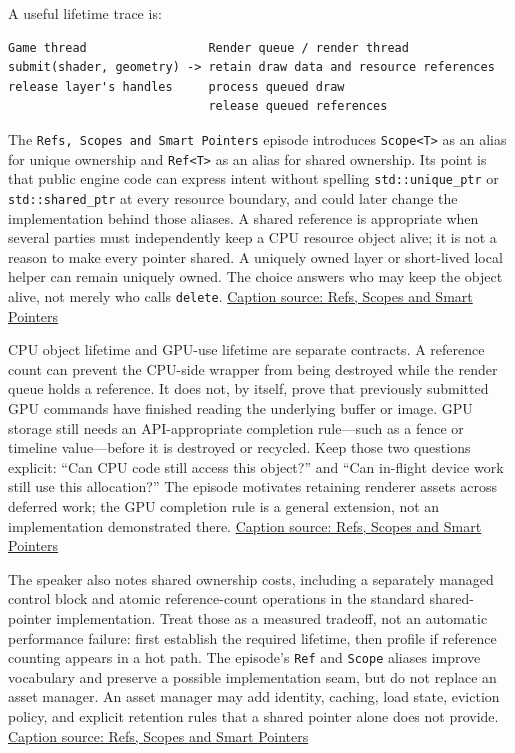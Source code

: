 A useful lifetime trace is:

\begin{verbatim}
Game thread                 Render queue / render thread
submit(shader, geometry) -> retain draw data and resource references
release layer's handles     process queued draw
                            release queued references
\end{verbatim}

The \texttt{Refs,\ Scopes\ and\ Smart\ Pointers} episode introduces \texttt{Scope\textless{}T\textgreater{}} as an alias for unique ownership and \texttt{Ref\textless{}T\textgreater{}} as an alias for shared ownership. Its point is that public engine code can express intent without spelling \texttt{std::unique\_ptr} or \texttt{std::shared\_ptr} at every resource boundary, and could later change the implementation behind those aliases. A shared reference is appropriate when several parties must independently keep a CPU resource object alive; it is not a reason to make every pointer shared. A uniquely owned layer or short-lived local helper can remain uniquely owned. The choice answers who may keep the object alive, not merely who calls \texttt{delete}. \href{https://www.youtube.com/watch?v=HkGZ378nArE}{Caption source: Refs, Scopes and Smart Pointers}

CPU object lifetime and GPU-use lifetime are separate contracts. A reference count can prevent the CPU-side wrapper from being destroyed while the render queue holds a reference. It does not, by itself, prove that previously submitted GPU commands have finished reading the underlying buffer or image. GPU storage still needs an API-appropriate completion rule---such as a fence or timeline value---before it is destroyed or recycled. Keep those two questions explicit: ``Can CPU code still access this object?'' and ``Can in-flight device work still use this allocation?'' The episode motivates retaining renderer assets across deferred work; the GPU completion rule is a general extension, not an implementation demonstrated there. \href{https://www.youtube.com/watch?v=HkGZ378nArE}{Caption source: Refs, Scopes and Smart Pointers}

The speaker also notes shared ownership costs, including a separately managed control block and atomic reference-count operations in the standard shared-pointer implementation. Treat those as a measured tradeoff, not an automatic performance failure: first establish the required lifetime, then profile if reference counting appears in a hot path. The episode's \texttt{Ref} and \texttt{Scope} aliases improve vocabulary and preserve a possible implementation seam, but do not replace an asset manager. An asset manager may add identity, caching, load state, eviction policy, and explicit retention rules that a shared pointer alone does not provide. \href{https://www.youtube.com/watch?v=HkGZ378nArE}{Caption source: Refs, Scopes and Smart Pointers}


